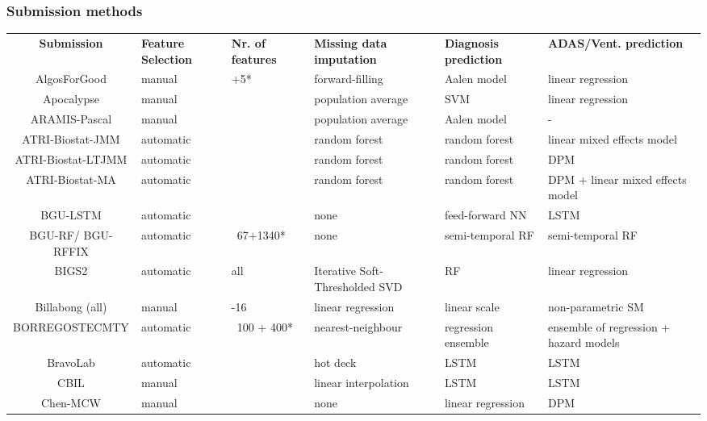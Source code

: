 \documentclass[8pt,xcolor=table,aspectratio=169]{beamer}
\begin{document}
\begin{frame}
\frametitle{Submission methods}



\begin{table}
 \centering
 \fontsize{4}{6}\selectfont
 \begin{tabular}{c | >{\centering\arraybackslash}p{1.3cm} >{\centering\arraybackslash}p{1.2cm} >{\centering\arraybackslash}p{2cm} >{\centering\arraybackslash}p{2cm} >{\centering\arraybackslash}p{2cm}}
\textbf{Submission} & \textbf{Feature Selection}  & \textbf{Nr. of features} & \textbf{Missing data imputation} & \textbf{Diagnosis prediction} & \textbf{ADAS/Vent. prediction}\\
\Xhline{1.5\arrayrulewidth}
AlgosForGood & manual & 16+5* & forward-filling & Aalen model & linear regression\\
Apocalypse & manual & 16 & population average & SVM & linear regression\\
ARAMIS-Pascal & manual & 20 & population average & Aalen model & -\\
ATRI-Biostat-JMM & automatic & 15 & random forest & random forest & linear mixed effects model\\
ATRI-Biostat-LTJMM & automatic & 15 & random forest & random forest & DPM\\
ATRI-Biostat-MA & automatic & 15 & random forest & random forest & DPM + linear mixed effects model\\
BGU-LSTM & automatic & 67 & none & feed-forward NN & LSTM\\
BGU-RF/ BGU-RFFIX & automatic & ~67+1340* & none & semi-temporal RF & semi-temporal RF\\
BIGS2 & automatic & all & Iterative Soft-Thresholded SVD & RF & linear regression\\
Billabong (all) & manual & 15-16 & linear regression & linear scale & non-parametric SM\\
BORREGOSTECMTY & automatic & ~100 + 400* & nearest-neighbour & regression ensemble & ensemble of regression + hazard models \\
BravoLab & automatic & 25 & hot deck & LSTM & LSTM\\
CBIL & manual & 21 & linear interpolation & LSTM & LSTM\\
Chen-MCW & manual & 9 & none & linear regression & DPM\\

\end{tabular}
\end{table}
\end{frame}
\end{document}

